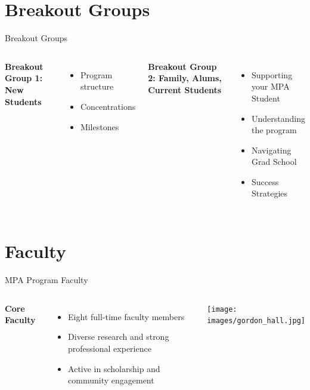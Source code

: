 \documentclass[10pt]{beamer}
\begin{document}
\section{\textcolor{titanorange}{Breakout Groups}}

\begin{frame}{Breakout Groups}
\begin{columns}[T,onlytextwidth]
  \textbf{Breakout Group 1: New Students}
  \begin{itemize}
    \item Program structure
    \item Concentrations
    \item Milestones
  \end{itemize}

  \textbf{Breakout Group 2: Family, Alums, Current Students}
  \begin{itemize}
    \item Supporting your MPA Student
    \item Understanding the program
    \item Navigating Grad School
    \item Success Strategies
  \end{itemize}
\end{columns}
\end{frame}

\section{\textcolor{titanorange}{Faculty}}
\begin{frame}{MPA Program Faculty}
\begin{columns}[T,onlytextwidth]
  \textbf{Core Faculty}
  \begin{itemize}
    \item Eight full-time faculty members
    \item Diverse research and strong professional experience
    \item Active in scholarship and community engagement
  \end{itemize}
  \texttt{[image: images/gordon\_hall.jpg]}
\end{columns}
\end{frame}
\end{document}
